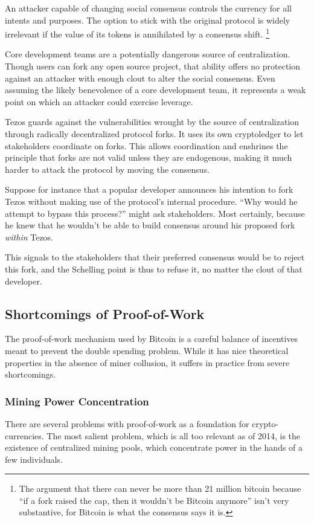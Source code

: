 \documentclass[letterpaper]{article}
\begin{document}
An attacker capable of changing social consensus
controls the currency for all intents and purposes.
The option to stick with the original protocol is widely irrelevant
if the value of its tokens is annihilated by a consensus shift.%
\footnote{The argument that there can never be more than 21 million bitcoin
because ``if a fork raised the cap, then it wouldn't be Bitcoin anymore''
isn't very substantive, for Bitcoin is what the consensus says it is.}

Core development teams are a potentially dangerous source of centralization.
Though users can fork any open source project,
that ability offers no protection against an attacker
with enough clout to alter the social consensus.
Even assuming the likely benevolence of a core development team,
it represents a weak point on which an attacker could exercise leverage.

Tezos guards against the vulnerabilities wrought by the source of centralization
through radically decentralized protocol forks.
It uses its own cryptoledger to let stakeholders coordinate on forks.
This allows coordination and enshrines the principle that
forks are not valid unless they are endogenous,
making it much harder to attack the protocol by moving the consensus.

Suppose for instance that a popular developer announces his intention to fork
Tezos without making use of the protocol's internal procedure. ``Why would he
attempt to bypass this process?'' might ask stakeholders. Most certainly,
because he knew that he wouldn't be able to build consensus around his proposed
fork \emph{within} Tezos.

This signals to the stakeholders that their preferred consensus would be to
reject this fork, and the Schelling point is thus to refuse it, no matter the
clout of that developer.


\subsection{Shortcomings of Proof-of-Work}

The proof-of-work mechanism used by Bitcoin is a careful balance
of incentives meant to prevent the double spending problem. 
While it has nice theoretical properties in the absence of miner
collusion, it suffers in practice from severe shortcomings.

\subsubsection{Mining Power Concentration}
There are several problems with proof-of-work as a foundation for
crypto-currencies. The most salient problem, which is all too relevant
as of 2014, is the existence of centralized mining pools, which concentrate
power in the hands of a few individuals.
\end{document}
